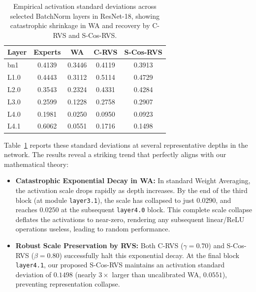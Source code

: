 \documentclass{article}
\theoremstyle{plain}
\theoremstyle{definition}
\theoremstyle{remark}
\begin{document}
\begin{table}[h]
\caption{Empirical activation standard deviations across selected BatchNorm layers in ResNet-18, showing catastrophic shrinkage in WA and recovery by C-RVS and S-Cos-RVS.}
\label{tab:activation_stds}
\begin{center}
\begin{small}
\begin{sc}
\setlength{\tabcolsep}{4pt}
\begin{tabular}{lcccc}
\toprule
Layer & Experts & WA & C-RVS & S-Cos-RVS \\
\midrule
bn1 & 0.4139 & 0.3446 & 0.4119 & 0.3913 \\
L1.0 & 0.4443 & 0.3112 & 0.5114 & 0.4729 \\
L2.0 & 0.3543 & 0.2324 & 0.4331 & 0.4284 \\
L3.0 & 0.2599 & 0.1228 & 0.2758 & 0.2907 \\
L4.0 & 0.1981 & 0.0250 & 0.0950 & 0.0923 \\
L4.1 & 0.6062 & 0.0551 & 0.1716 & 0.1498 \\
\bottomrule
\end{tabular}
\end{sc}
\end{small}
\end{center}
\end{table}

Table~\ref{tab:activation_stds} reports these standard deviations at several representative depths in the network. The results reveal a striking trend that perfectly aligns with our mathematical theory:
\begin{itemize}\sloppy
    \item \textbf{Catastrophic Exponential Decay in WA:} In standard Weight Averaging, the activation scale drops rapidly as depth increases. By the end of the third block (at module \texttt{layer3.1}), the scale has collapsed to just $0.0290$, and reaches $0.0250$ at the subsequent \texttt{layer4.0} block. This complete scale collapse deflates the activations to near-zero, rendering any subsequent linear/ReLU operations useless, leading to random performance.
    \item \textbf{Robust Scale Preservation by RVS:} Both C-RVS ($\gamma=0.70$) and S-Cos-RVS ($\beta=0.80$) successfully halt this exponential decay. At the final block \texttt{layer4.1}, our proposed S-Cos-RVS maintains an activation standard deviation of $0.1498$ (nearly $3\times$ larger than uncalibrated WA, $0.0551$), preventing representation collapse.
\end{itemize}
\end{document}
